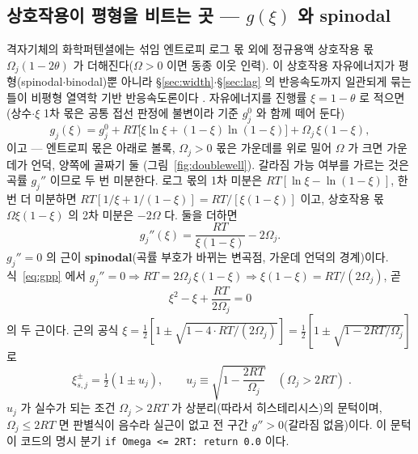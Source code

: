 \documentclass[11pt,a4paper]{article}
\newcommand{\code}[1]{\texttt{#1}}
\begin{document}
\subsection{상호작용이 평형을 비트는 곳 — $g(\xi)$ 와 spinodal}
격자기체의 화학퍼텐셜에는 섞임 엔트로피 로그 몫 외에 정규용액 상호작용 몫 $\Omega_j(1-2\theta)$ 가 더해진다($\Omega>0$
이면 동종 이웃 인력). 이 상호작용 자유에너지가 평형(spinodal$\cdot$binodal)뿐 아니라 \S\ref{sec:width}$\cdot$\S\ref{sec:lag}
의 반응속도까지 일관되게 묶는 틀이 비평형 열역학 기반 반응속도론이다 \cite{bazant2013}. 자유에너지를 진행률 $\xi=1-\theta$ 로
적으면(상수$\cdot$$\xi$ 1차 몫은 공통 접선 판정에 불변이라 기준 $g_j^0$ 와 함께 떼어 둔다)
\begin{equation}
g_j(\xi)=g_j^0+RT\big[\xi\ln\xi+(1-\xi)\ln(1-\xi)\big]+\Omega_j\,\xi(1-\xi),
\label{eq:gxi}
\end{equation}
이고 — 엔트로피 몫은 아래로 볼록, $\Omega_j>0$ 몫은 가운데를 위로 밀어 $\Omega$ 가 크면 가운데가 언덕, 양쪽에 골짜기 둘
(그림~\ref{fig:doublewell}). 갈라짐 가능 여부를 가르는 것은 곡률 $g_j''$ 이므로 두 번 미분한다. 로그 몫의 1차 미분은
$RT[\ln\xi-\ln(1-\xi)]$, 한 번 더 미분하면 $RT[1/\xi+1/(1-\xi)]=RT/[\xi(1-\xi)]$ 이고, 상호작용 몫 $\Omega\xi(1-\xi)$
의 2차 미분은 $-2\Omega$ 다. 둘을 더하면
\begin{equation}
g_j''(\xi)=\frac{RT}{\xi(1-\xi)}-2\Omega_j.
\label{eq:gpp}
\end{equation}
$g_j''=0$ 의 근이 \textbf{spinodal}(곡률 부호가 바뀌는 변곡점, 가운데 언덕의 경계)이다. 식~\eqref{eq:gpp} 에서
$g_j''=0\Rightarrow RT=2\Omega_j\,\xi(1-\xi)\Rightarrow\xi(1-\xi)=RT/(2\Omega_j)$, 곧
\begin{equation}
\xi^2-\xi+\frac{RT}{2\Omega_j}=0
\label{eq:spinquad}
\end{equation}
의 두 근이다. 근의 공식 $\xi=\tfrac12[1\pm\sqrt{1-4\cdot RT/(2\Omega_j)}]=\tfrac12[1\pm\sqrt{1-2RT/\Omega_j}]$ 로
\begin{equation}
\boxed{\;\xi_{s,j}^\pm=\tfrac12(1\pm u_j),\qquad
u_j\equiv\sqrt{1-\frac{2RT}{\Omega_j}}\quad(\Omega_j>2RT)\;.}
\label{eq:spinodal}
\end{equation}
$u_j$ 가 실수가 되는 조건 $\Omega_j>2RT$ 가 상분리(따라서 히스테리시스)의 문턱이며, $\Omega_j\le2RT$ 면 판별식이
음수라 실근이 없고 전 구간 $g''>0$(갈라짐 없음)이다. 이 문턱이 코드의 명시 분기 \code{if Omega <= 2RT: return 0.0} 이다.
\end{document}
